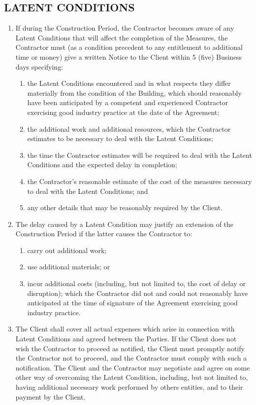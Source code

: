 \begin{multicols}{2}
\subsection{LATENT CONDITIONS}
\begin{enumerate}
	\item  If during the Construction Period, the Contractor becomes aware of any Latent Conditions that will affect the completion of the Measures, the Contractor must (as a condition precedent to any entitlement to additional time or money) give a written Notice to the Client within 5 (five) Business days specifying:
	\begin{enumerate}
		\item	the Latent Conditions encountered and in what respects they differ materially from the condition of the Building, which should reasonably have been anticipated by a competent and experienced Contractor exercising good industry practice at the date of the Agreement;
		\item	the additional work and additional resources, which the Contractor estimates to be necessary to deal with the Latent Conditions;
		\item	the time the Contractor estimates will be required to deal with the Latent Conditions and the expected delay in completion;
		\item	the Contractor’s reasonable estimate of the cost of the measures necessary to deal with the Latent Conditions; and
		\item	any other details that may be reasonably required by the Client.
	\end{enumerate}
	\item The delay caused by a Latent Condition may justify an extension of the Construction Period if the latter causes the Contractor to:
	\begin{enumerate}
		\item	carry out additional work;
		\item	use additional materials; or
		\item	incur additional costs (including, but not limited to, the cost of delay or disruption); which the Contractor did not and could not reasonably have anticipated at the time of signature of the Agreement exercising good industry practice.
	\end{enumerate}
	\item	The Client shall cover all actual expenses which arise in connection with Latent Conditions and agreed between the Parties. If the Client does not wish the Contractor to proceed as notified, the Client must promptly notify the Contractor not to proceed, and the Contractor must comply with such a notification. The Client and the Contractor may negotiate and agree on some other way of overcoming the Latent Condition, including, but not limited to, having additional necessary work performed by others entities, and to their payment by the Client.

\end{enumerate}
\end{multicols}
